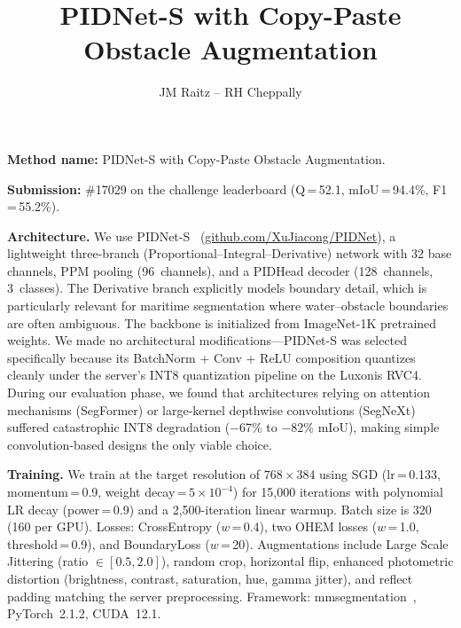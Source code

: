 \documentclass[10pt,twocolumn,letterpaper]{article}
\begin{document}
\title{PIDNet-S with Copy-Paste Obstacle Augmentation}
\author{JM Raitz -- RH Cheppally}
\maketitle
\thispagestyle{empty}


\noindent\textbf{Method name:} PIDNet-S with Copy-Paste Obstacle Augmentation.

\noindent\textbf{Submission:} \#17029 on the challenge leaderboard (Q\,=\,52.1, mIoU\,=\,94.4\%, F1\,=\,55.2\%).

\vspace{0.3em}
\noindent\textbf{Architecture.}
We use PIDNet-S~\cite{xu2023pidnet} (\href{https://github.com/XuJiacong/PIDNet}{github.com/XuJiacong/PIDNet}), a lightweight three-branch (Proportional--Integral--Derivative) network with 32 base channels, PPM pooling (96~channels), and a PIDHead decoder (128~channels, 3~classes). The Derivative branch explicitly models boundary detail, which is particularly relevant for maritime segmentation where water--obstacle boundaries are often ambiguous. The backbone is initialized from ImageNet-1K pretrained weights. We made no architectural modifications---PIDNet-S was selected specifically because its BatchNorm + Conv + ReLU composition quantizes cleanly under the server's INT8 quantization pipeline on the Luxonis RVC4. During our evaluation phase, we found that architectures relying on attention mechanisms (SegFormer) or large-kernel depthwise convolutions (SegNeXt) suffered catastrophic INT8 degradation ($-$67\% to $-$82\% mIoU), making simple convolution-based designs the only viable choice.

\vspace{0.3em}
\noindent\textbf{Training.}
We train at the target resolution of $768 \times 384$ using SGD (lr\,=\,0.133, momentum\,=\,0.9, weight decay\,=\,$5{\times}10^{-4}$) for 15{,}000 iterations with polynomial LR decay (power\,=\,0.9) and a 2{,}500-iteration linear warmup.
Batch size is 320 (160 per GPU). Losses: CrossEntropy ($w$\,=\,0.4), two OHEM losses ($w$\,=\,1.0, threshold\,=\,0.9), and BoundaryLoss ($w$\,=\,20). Augmentations include Large Scale Jittering (ratio $\in [0.5, 2.0]$), random crop, horizontal flip, enhanced photometric distortion (brightness, contrast, saturation, hue, gamma jitter), and reflect padding matching the server preprocessing. Framework: mmsegmentation~\cite{mmseg2020}, PyTorch~2.1.2, CUDA~12.1.
\end{document}
